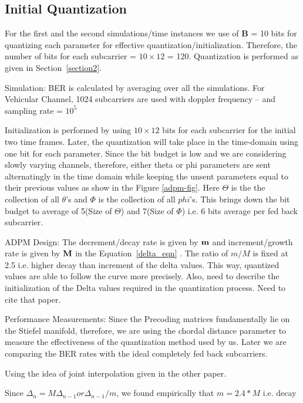 \documentclass[conference]{IEEEtran}
\begin{document}
\subsection{Initial Quantization}
For the first and the second simulations/time instances we use of $\textbf{B}$ = 10 bits for quantizing each parameter for effective quantization/initialization. Therefore, the number of bits for each subcarrier = $10\times12$ = 120. Quantization is performed as given in Section~\ref{section2}.

Simulation: BER is calculated by averaging over all the simulations. For Vehicular Channel, 1024 subcarriers are used with doppler frequency – and sampling rate = $10^{5}$

Initialization is performed by using $10\times12$ bits for each subcarrier for the initial two time frames. Later, the quantization will take place in the time-domain using one bit for each parameter. Since the bit budget is low and we are considering slowly varying channels, therefore, either theta or phi parameters are sent alternatingly in the time domain while keeping the unsent parameters equal to their previous values as show in the Figure \ref{adpm-fig}. Here $\Theta$ is the the collection of all $\theta$'s and $\Phi$ is the collection of all $phi$'s. This brings down the bit budget to average of 5(Size of $\Theta$) and 7(Size of $\Phi$) i.e. 6 bits average per fed back subcarrier.

{ADPM Design}: The decrement/decay rate is given by ${\bf m}$ and increment/growth rate is given by ${\bf M}$ in the Equation~\ref{delta_eqn} . The ratio of $m/M$ is fixed at 2.5 i.e. higher decay than increment of the delta values. This way, quantized values are able to follow the curve more precisely. Also, need to describe the initialization of the Delta values required in the quantization process. Need to cite that paper.

Performance Measurements:
Since the Precoding matrices fundamentally lie on the Stiefel manifold, therefore, we are using the chordal distance parameter to measure the effectiveness of the quantization method used by us. Later we are comparing the BER rates with the ideal completely fed back subcarriers.

Using the idea of joint interpolation given in the other paper.

Since $\Delta_{n} = M\Delta_{n-1} or \Delta_{n-1}/m $, we found empirically that $m=2.4*M$ i.e. decay
\end{document}
